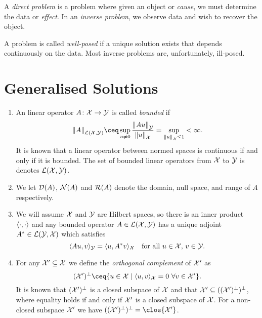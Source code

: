 \begin{mdframed}
A \emph{direct problem} is a problem where given an object or \emph{cause}, we must determine the data or \emph{effect}. In an \emph{inverse problem}, we observe data and wish to recover the object. 

A problem is called \emph{well-posed} if a unique solution exists that depends continuously on the data. Most inverse problems are, unfortunately, ill-posed. 
\end{mdframed}

\section{Generalised Solutions}
\begin{recap}
    \begin{enumerate}
        \item     An linear operator $A \colon \mathcal X \to \mathcal Y$ is called \emph{bounded} if
        \[
        \norm{A}_{\LL(\XX, \YY)} \ceq \sup_{u \neq 0} \frac{\norm{Au}_\YY}{\norm{u}_\XX} = \sup_{\norm{u}_\XX \leq 1} < \infty. 
        \]
            It is known that a linear operator between normed spaces is continuous if and only if it is bounded. The set of bounded linear operators from $\mathcal X$ to $\mathcal Y$ is denotes $\mathcal L(\mathcal X, \mathcal Y)$. 
            \item 
        We let $\operatorname{\mathcal D}(A)$, $\operatorname{\mathcal N}(A)$ and  $\operatorname{\mathcal R}(A)$ denote the domain, null space, and range of $A$ respectively. 
        
        \item     We will assume $\mathcal X$ and $\mathcal Y$ are Hilbert spaces, so there is an inner product $\langle\cdot, \cdot\rangle$ and any bounded operator $A \in \mathcal L(\mathcal X, \mathcal Y)$ has a unique adjoint $A^* \in \mathcal L(\mathcal Y, \mathcal X)$ which satisfies
        \[
        \langle Au, v\rangle_\mathcal Y = \langle u, A^* v\rangle_\mathcal X \quad\text{for all $u \in \mathcal X$, $v \in \mathcal Y$.}
        \]
        
        \item For any $\mathcal X' \subseteq \mathcal X$ we define the \emph{orthogonal complement} of $\mathcal X'$ as
        \[
        (\XX')\P \ceq \qty{u \in \XX \mid \ang{u, v}_\XX = 0 \ \forall v \in \XX'}. 
        \]
        It is known that $(\mathcal X')^\perp$ is a closed subspace of $\mathcal X$ and that $\mathcal X' \subseteq ((\mathcal X')^\perp)^\perp$, where equality holds if and only if $\mathcal X'$ is a closed subspace of $\mathcal X$. For a non-closed subspace $\mathcal X'$ we have $((\XX')\P)\P = \clos{\XX'}$. 
        

\end{enumerate}
\end{recap}
